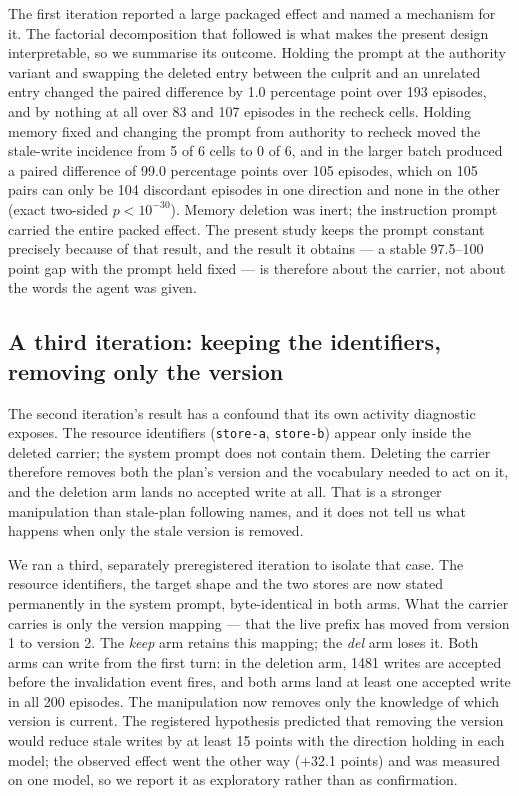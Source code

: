 \documentclass[11pt]{article}
\begin{document}
\begin{sloppypar}
The first iteration reported a large packaged effect and named a mechanism for it. The factorial decomposition that followed is what makes the present design interpretable, so we summarise its outcome. Holding the prompt at the authority variant and swapping the deleted entry between the culprit and an unrelated entry changed the paired difference by 1.0 percentage point over 193 episodes, and by nothing at all over 83 and 107 episodes in the recheck cells. Holding memory fixed and changing the prompt from authority to recheck moved the stale-write incidence from 5 of 6 cells to 0 of 6, and in the larger batch produced a paired difference of 99.0 percentage points over 105 episodes, which on 105 pairs can only be 104 discordant episodes in one direction and none in the other (exact two-sided $p<10^{-30}$). Memory deletion was inert; the instruction prompt carried the entire packed effect. The present study keeps the prompt constant precisely because of that result, and the result it obtains --- a stable 97.5--100 point gap with the prompt held fixed --- is therefore about the carrier, not about the words the agent was given.

\subsection{A third iteration: keeping the identifiers, removing only the version}
\label{sec:v3}

The second iteration's result has a confound that its own activity diagnostic exposes. The resource identifiers (\texttt{store-a}, \texttt{store-b}) appear only inside the deleted carrier; the system prompt does not contain them. Deleting the carrier therefore removes both the plan's version and the vocabulary needed to act on it, and the deletion arm lands no accepted write at all. That is a stronger manipulation than stale-plan following names, and it does not tell us what happens when only the stale version is removed.

We ran a third, separately preregistered iteration to isolate that case. The resource identifiers, the target shape and the two stores are now stated permanently in the system prompt, byte-identical in both arms. What the carrier carries is only the version mapping --- that the live prefix has moved from version 1 to version 2. The \emph{keep} arm retains this mapping; the \emph{del} arm loses it. Both arms can write from the first turn: in the deletion arm, 1481 writes are accepted before the invalidation event fires, and both arms land at least one accepted write in all 200 episodes. The manipulation now removes only the knowledge of which version is current. The registered hypothesis predicted that removing the version would reduce stale writes by at least 15 points with the direction holding in each model; the observed effect went the other way (+32.1 points) and was measured on one model, so we report it as exploratory rather than as confirmation.


\end{sloppypar}
\end{document}
